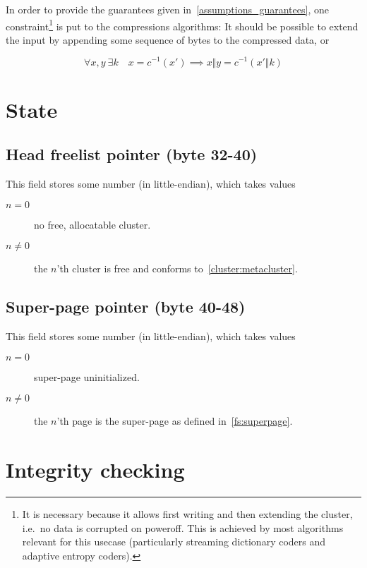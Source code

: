 \documentclass[11pt,a4paper]{report}
\newcommand{\concat}{\Vert}
\begin{document}
        In order to provide the guarantees given
        in~\ref{assumptions_guarantees}, one constraint\footnote{It is
        necessary because it allows first writing and then extending the
        cluster, i.e.\ no data is corrupted on poweroff.  This is achieved
        by most algorithms relevant for this usecase (particularly
        streaming dictionary coders and adaptive entropy coders).} is put to
        the compressions algorithms: It should be possible to extend the input
        by appending some sequence of bytes to the compressed data, or

        $$\forall x, y \  \exists k \quad x = c^{-1}(x') \implies x \concat y = c^{-1}(x' \concat k)$$

    \section{State}
        \subsection{Head freelist pointer (byte 32-40)}
        This field stores some number (in little-endian), which takes values

        \begin{description}
            \item [$n = 0$]    no free, allocatable cluster.
            \item [$n \neq 0$] the $n$'th cluster is free and conforms
                to~\ref{cluster:metacluster}.
        \end{description}

        \subsection{Super-page pointer (byte 40-48)}
        This field stores some number (in little-endian), which takes values

        \begin{description}
            \item [$n = 0$]    super-page uninitialized.
            \item [$n \neq 0$] the $n$'th page is the super-page as
                defined in~\ref{fs:superpage}.
        \end{description}

    \section{Integrity checking}
\end{document}
